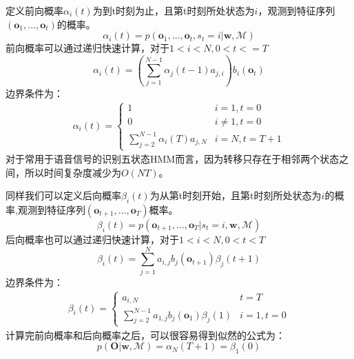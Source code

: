 定义前向概率$\alpha_i(t)$为到t时刻为止，且第t时刻所处状态为$i$，观测到特征序列$\left( \mathbf{o}_1, \dots, \mathbf{o}_t \right)$的概率。
\begin{equation}
\alpha_i(t)=p(\mathbf{o}_1, \dots, \mathbf{o}_t,s_t=i|\mathbf{w}, \mathcal{M})
\end{equation}
前向概率可以通过递归快速计算，对于$1<i<N, 0<t<=T$
\begin{equation}
\alpha_i(t)=(\sum_{j=1}^{N-1}\alpha_j(t-1)a_{j,i})b_i(\mathbf{o}_t)
\end{equation}
边界条件为：
\begin{eqnarray}
\alpha_i(t)=
\begin{cases}
1& i=1,t=0 \\
0& i \ne 1,t=0 \\
\sum_{j=2}^{N-1}\alpha_i(T)a_{j,N}& i=N, t=T+1
\end{cases}
\end{eqnarray}
对于常用于语音信号的识别五状态HMM而言，因为转移只存在于相邻两个状态之间，所以时间复杂度减少为$O(NT)$。

同样我们可以定义后向概率$\beta_i(t)$为从第t时刻开始，且第t时刻所处状态为$i$的概率,观测到特征序列$\left( \mathbf{o}_{t+1}, \dots, \mathbf{o}_T \right)$概率。
\begin{equation}
\beta_i(t)=p(\mathbf{o}_{t+1},...,\mathbf{o}_T|s_t=i, \mathbf{w}, \mathcal{M})
\end{equation}
后向概率也可以通过递归快速计算，对于$1<i<N, 0<t<T$
\begin{equation}
\beta_i(t)=\sum_{j=1}^{N} a_{i,j} b_j(\mathbf{o}_{t+1}) \beta_j(t+1)
\end{equation}
边界条件为：
\begin{eqnarray}
\beta_i(t)=
\begin{cases}
a_{i,N} & t=T \\
\sum_{j=2}^{N-1} a_{1,j} b_j(\mathbf{o}_{1}) \beta_j(1) & i=1, t=0
\end{cases}
\end{eqnarray}
计算完前向概率和后向概率之后，可以很容易得到似然的公式为：
\begin{equation}
    p(\mathbf{O}|\mathbf{w}, \mathcal{M})=\alpha_N(T+1)=\beta_1(0)
\end{equation}

